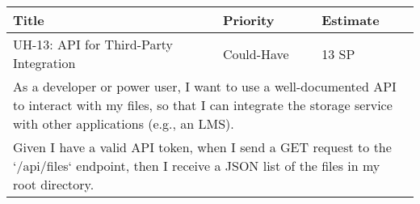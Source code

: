 \vspace{5mm}
\begin{tabular}{|p{4cm}|p{5cm}|p{5cm}|}
    \hline
    \textbf{Title} & \textbf{Priority} & \textbf{Estimate} \\
    \hline
    UH-13: API for Third-Party Integration & Could-Have & 13 SP \\
    \hline
    \multicolumn{3}{|p{14cm}|}{As a developer or power user, I want to use a well-documented API to interact with my files, so that I can integrate the storage service with other applications (e.g., an LMS).} \\
    \hline
    \multicolumn{3}{|p{14cm}|}{Given I have a valid API token, when I send a GET request to the `/api/files` endpoint, then I receive a JSON list of the files in my root directory.} \\
    \hline
\end{tabular}

